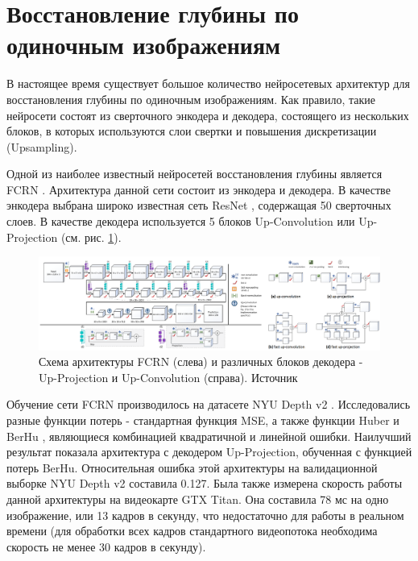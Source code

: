 \documentclass{mipt-thesis-ms}
\begin{document}
	\section{Восстановление глубины по одиночным изображениям}
	
	В настоящее время существует большое количество нейросетевых архитектур для восстановления глубины по одиночным изображениям. Как правило, такие нейросети состоят из сверточного энкодера и декодера, состоящего из нескольких блоков, в которых используются слои свертки и повышения дискретизации (Upsampling).
	
	Одной из наиболее известный нейросетей восстановления глубины является FCRN \cite{laina2016deeper}. Архитектура данной сети состоит из энкодера и декодера. В качестве энкодера выбрана широко известная сеть ResNet \cite{he2016deep}, содержащая 50 сверточных слоев. В качестве декодера используется 5 блоков Up-Convolution или Up-Projection (см. рис. \ref{figure_upconv_upproj}).
	
	\begin{figure}
		\includegraphics[width=1.0\textwidth]{img/fcrn_scheme_full.png}
		\caption{Схема архитектуры FCRN (слева) и различных блоков декодера - Up-Projection и Up-Convolution (справа). Источник \cite{laina2016deeper}}
		\label{figure_upconv_upproj}
	\end{figure}

	Обучение сети FCRN производилось на датасете NYU Depth v2 \cite{silberman2012indoor}. Исследовались разные функции потерь - стандартная функция MSE, а также функции Huber и BerHu \cite{owen2007robust} \cite{zwald2012berhu}, являющиеся комбинацией квадратичной и линейной ошибки. Наилучший результат показала архитектура с декодером Up-Projection, обученная с функцией потерь BerHu. Относительная ошибка этой архитектуры на валидационной выборке NYU Depth v2 составила 0.127. Была также измерена скорость работы данной архитектуры на видеокарте GTX Titan. Она составила 78 мс на одно изображение, или 13 кадров в секунду, что недостаточно для работы в реальном времени (для обработки всех кадров стандартного видеопотока необходима скорость не менее 30 кадров в секунду).
	
\end{document}
